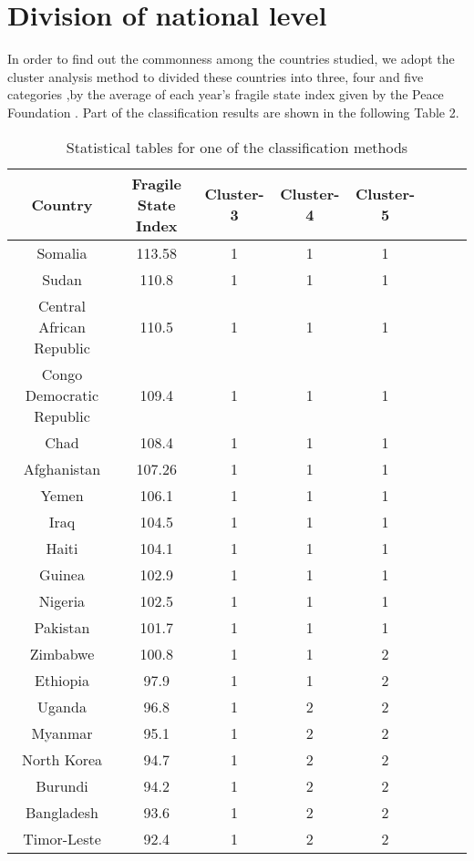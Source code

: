 \documentclass{mcmthesis}
\begin{document}
\section {Division of national level}
In order to find out the commonness among the countries studied, we adopt the cluster analysis method to divided these countries into three, four and five categories ,by the average of each year's fragile state index given by the Peace Foundation . Part of the classification results are shown in the following Table 2.
\begin{center}
\begin{table}[htbp]
\caption{Statistical tables for one of the classification methods}
\begin{tabular}{c|ccccccc}   %
\hline
Country &Fragile State Index & Cluster-3 & Cluster-4 & Cluster-5 \\%
\hline
Somalia &113.58 &1	 &1	 &1 \\
Sudan &110.8 &1	 &1	 &1 \\
Central African Republic &110.5		&1	 &1	 &1 \\
Congo Democratic Republic&109.4	&1	 &1		 &1 \\
Chad  &108.4 	&1		 &1	 &1 \\
Afghanistan &107.26		&1	 &1	 &1 \\
Yemen	&106.1 &1	 &1		 &1 \\
Iraq &104.5 &1		 &1	 &1 \\
Haiti &104.1		&1	 &1	 &1 \\
Guinea	&102.9	&1	 &1	 &1 \\
Nigeria		&102.5 &1		&1	 &1 \\
Pakistan	&101.7 	&1	 &1	 &1 \\
Zimbabwe	&100.8	&1  &1	 &2 \\
Ethiopia &97.9		&1	&1	 &2 \\
Uganda	&96.8	&1		&2	 &2 \\
Myanmar		&95.1	&1 &2	 &2 \\
North Korea &94.7	&1	&2	&2 \\
Burundi		&94.2	&1	&2	 &2 \\
Bangladesh	 &93.6	&1	&2	 &2 \\
Timor-Leste	&92.4	&1	&2	 &2 \\

\hline
\end{tabular}
\end{table}
\end{center}
\end{document}

